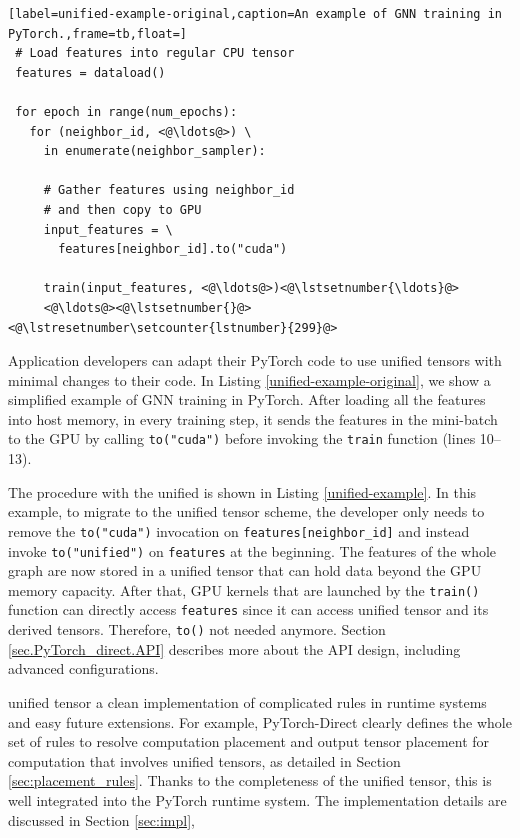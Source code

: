 \begin{lstlisting}[label=unified-example-original,caption=An example of GNN training in PyTorch.,frame=tb,float=]
 # Load features into regular CPU tensor
 features = dataload()
  
 for epoch in range(num_epochs):
   for (neighbor_id, <@\ldots@>) \
     in enumerate(neighbor_sampler):
      
     # Gather features using neighbor_id
     # and then copy to GPU
     input_features = \
       features[neighbor_id].to("cuda")
          
     train(input_features, <@\ldots@>)<@\lstsetnumber{\ldots}@>
     <@\ldots@><@\lstsetnumber{}@><@\lstresetnumber\setcounter{lstnumber}{299}@>

\end{lstlisting}




Application developers can adapt their PyTorch code to use unified tensors with minimal changes to their code.
In Listing \ref{unified-example-original}, we show a simplified example of GNN training in PyTorch.
After loading all the features into host memory, in every training step, it sends the features in the mini-batch to the GPU by calling \texttt{to("cuda")} before invoking the \texttt{train} function (lines 10--13).


The procedure with the unified  is shown in Listing \ref{unified-example}.
In this example, to migrate to the unified tensor scheme, the developer only needs to remove the \texttt{to("cuda")} invocation on \texttt{features[neighbor\_id]} and instead invoke \texttt{to("unified")} on \texttt{features} at the beginning.
The features of the whole graph are now stored in a unified tensor that can hold data beyond the GPU memory capacity.
After that, GPU kernels that are launched by the \texttt{train()} function can directly access \texttt{features} since it can access \kwc{a} unified tensor and its derived tensors.
Therefore, \texttt{to()} \kwc{calls are} not needed anymore.
Section \ref{sec.PyTorch_direct.API} describes more about the API design, including advanced configurations.



 unified tensor  a clean implementation of complicated rules in runtime systems and easy future extensions.
For example, PyTorch-Direct clearly defines the whole set of rules to resolve computation placement and output tensor placement for computation that involves unified tensors, as detailed in Section \ref{sec:placement_rules}. Thanks to the completeness of the unified tensor, this  is well integrated into the PyTorch runtime system. The implementation details are discussed in Section \ref{sec:impl},

